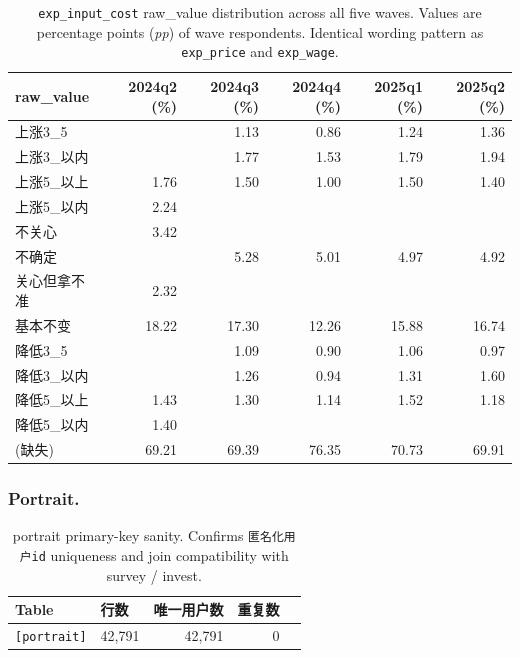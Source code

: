 \documentclass[11pt,letterpaper,english,final]{article}
\begin{document}
\begin{table}[H]
\centering
\small
\setlength{\tabcolsep}{5pt}
\caption{\texttt{exp\_input\_cost} raw\_value distribution across all five waves. Values are percentage points (\textit{pp}) of wave respondents. Identical wording pattern as \texttt{exp\_price} and \texttt{exp\_wage}.}
\label{tab:exp_input_cost_dist}
\begin{tabular}{@{}l r r r r r@{}}
\toprule
{raw\_value} & {2024q2 (\%)} & {2024q3 (\%)} & {2024q4 (\%)} & {2025q1 (\%)} & {2025q2 (\%)} \\
\midrule
上涨3\_5     &       & 1.13  & 0.86  & 1.24  & 1.36  \\
上涨3\_以内  &       & 1.77  & 1.53  & 1.79  & 1.94  \\
上涨5\_以上  & 1.76  & 1.50  & 1.00  & 1.50  & 1.40  \\
上涨5\_以内  & 2.24  &       &       &       &       \\
不关心      & 3.42  &       &       &       &       \\
不确定      &       & 5.28  & 5.01  & 4.97  & 4.92  \\
关心但拿不准 & 2.32  &       &       &       &       \\
基本不变    & 18.22 & 17.30 & 12.26 & 15.88 & 16.74 \\
降低3\_5     &       & 1.09  & 0.90  & 1.06  & 0.97  \\
降低3\_以内  &       & 1.26  & 0.94  & 1.31  & 1.60  \\
降低5\_以上  & 1.43  & 1.30  & 1.14  & 1.52  & 1.18  \\
降低5\_以内  & 1.40  &       &       &       &       \\
\midrule
(缺失)        & 69.21 & 69.39 & 76.35 & 70.73 & 69.91 \\
\bottomrule
\end{tabular}
\end{table}

\newpage
\subsubsection{Portrait.}
\begin{table}[H]
\centering
\small
\setlength{\tabcolsep}{6pt}
\caption{portrait primary-key sanity. Confirms \texttt{匿名化用户id} uniqueness and join compatibility with survey / invest.}
\label{tab:primary_key_sanity}
\begin{tabular}{@{}l l r r r@{}}
\toprule
{Table} & {行数} & {唯一用户数} & {重复数} \\
\midrule
\texttt{[portrait]} & 42{,}791 & 42{,}791 & 0 \\
\bottomrule
\end{tabular}
\end{table}
\end{document}
